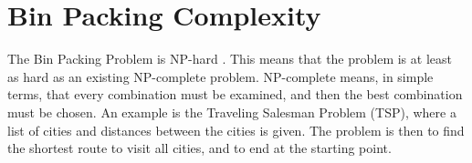 \section{Bin Packing Complexity}
The Bin Packing Problem is NP-hard \citep{combopt}. This means that the problem is at least as hard as an existing NP-complete problem. NP-complete means, in simple terms, that every combination must be examined, and then the best combination must be chosen. An example is the Traveling Salesman Problem (TSP), where a list of cities and distances between the cities is given. The problem is then to find the shortest route to visit all cities, and to end at the starting point. 
